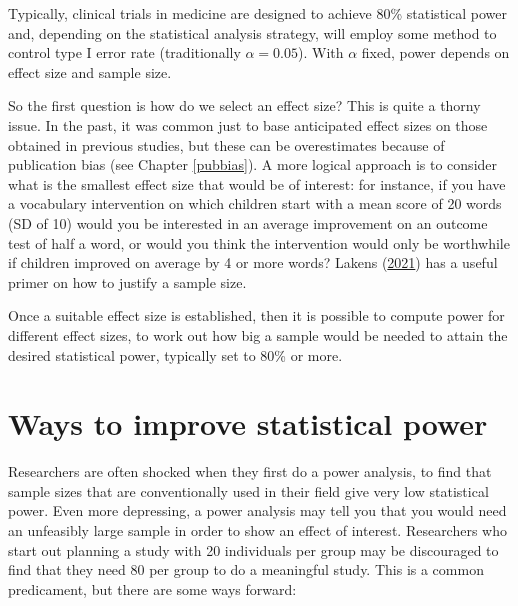 \documentclass{krantz}
\begin{document}
Typically, clinical trials in medicine are designed to achieve 80\% statistical power and, depending on the statistical analysis strategy, will employ some method to control type I error rate (traditionally \(\alpha=0.05\)). With \(\alpha\) fixed, power depends on effect size and sample size.

So the first question is how do we select an effect size? This is quite a thorny issue. In the past, it was common just to base anticipated effect sizes on those obtained in previous studies, but these can be overestimates because of publication bias (see Chapter \ref{pubbias}). A more logical approach is to consider what is the smallest effect size that would be of interest: for instance, if you have a vocabulary intervention on which children start with a mean score of 20 words (SD of 10) would you be interested in an average improvement on an outcome test of half a word, or would you think the intervention would only be worthwhile if children improved on average by 4 or more words? Lakens (\protect\hyperlink{ref-lakens2021}{2021}) has a useful primer on how to justify a sample size.

Once a suitable effect size is established, then it is possible to compute power for different effect sizes, to work out how big a sample would be needed to attain the desired statistical power, typically set to 80\% or more.

\hypertarget{ways-to-improve-statistical-power}{%
\section{Ways to improve statistical power}\label{ways-to-improve-statistical-power}}

Researchers are often shocked when they first do a power analysis, to find that sample sizes that are conventionally used in their field give very low statistical power. Even more depressing, a power analysis may tell you that you would need an unfeasibly large sample in order to show an effect of interest. Researchers who start out planning a study with 20 individuals per group may be discouraged to find that they need 80 per group to do a meaningful study. This is a common predicament, but there are some ways forward:
\end{document}
